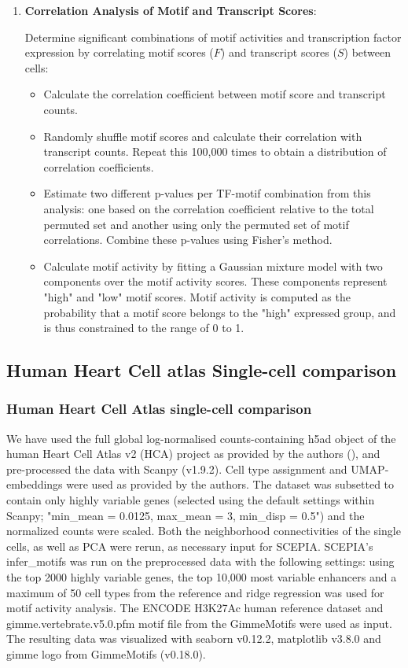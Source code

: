 \begin{enumerate}
    \item \textbf{Correlation Analysis of Motif and Transcript Scores}:
    
    Determine significant combinations of motif activities and transcription factor expression by correlating motif scores ($F$) and transcript scores ($S$) between cells:
    \begin{itemize}
        \item Calculate the correlation coefficient between motif score and transcript counts.
        \item Randomly shuffle motif scores and calculate their correlation with transcript counts. Repeat this 100,000 times to obtain a distribution of correlation coefficients.
        \item Estimate two different p-values per TF-motif combination from this analysis: one based on the correlation coefficient relative to the total permuted set and another using only the permuted set of motif correlations. Combine these p-values using Fisher's method.
        \item Calculate motif activity by fitting a Gaussian mixture model with two components over the motif activity scores. These components represent "high" and "low" motif scores. Motif activity is computed as the probability that a motif score belongs to the "high" expressed group, and is thus constrained to the range of 0 to 1.
    \end{itemize}
\end{enumerate}

\subsection{Human Heart Cell atlas Single-cell comparison}

\subsubsection{Human Heart Cell Atlas single-cell comparison}

We have used the full global log-normalised counts-containing h5ad object of the human Heart Cell Atlas v2 (HCA) project as provided by the authors (\cite{Kanemaru2023}), and pre-processed the data with Scanpy (v1.9.2). Cell type assignment and UMAP-embeddings were used as provided by the authors. The dataset was subsetted to contain only highly variable genes (selected using the default settings within Scanpy; "min\_mean = 0.0125, max\_mean = 3, min\_disp = 0.5") and the normalized counts were scaled. Both the neighborhood connectivities of the single cells, as well as PCA were rerun, as necessary input for SCEPIA. SCEPIA's infer\_motifs was run on the preprocessed data with the following settings: using the top 2000 highly variable genes, the top 10,000 most variable enhancers and a maximum of 50 cell types from the reference and ridge regression was used for motif activity analysis. The ENCODE H3K27Ac human reference dataset and gimme.vertebrate.v5.0.pfm motif file from the GimmeMotifs were used as input. The resulting data was visualized with seaborn v0.12.2, matplotlib v3.8.0 and gimme logo from GimmeMotifs (v0.18.0).

